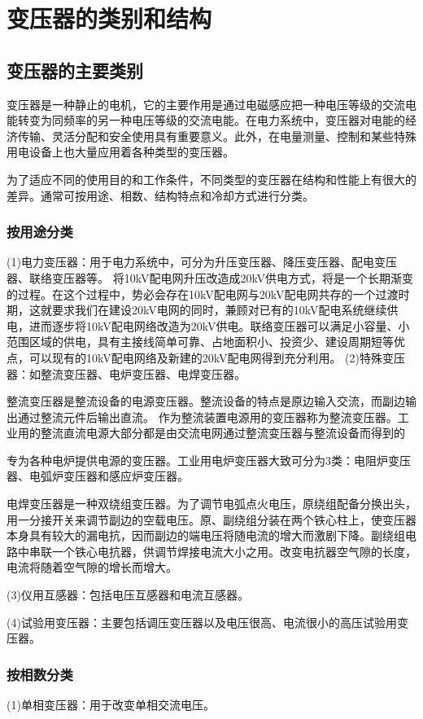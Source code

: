 \documentclass{book}
\begin{document}
\chapter{变压器的类别和结构}
\section{变压器的主要类别}
变压器是一种静止的电机，它的主要作用是通过电磁感应把一种电压等级的交流电能转变为同频率的另一种电压等级的交流电能。在电力系统中，变压器对电能的经济传输、灵活分配和安全使用具有重要意义。此外，在电量测量、控制和某些特殊用电设备上也大量应用着各种类型的变压器。

为了适应不同的使用目的和工作条件，不同类型的变压器在结构和性能上有很大的差异。通常可按用途、相数、结构特点和冷却方式进行分类。
\subsection{按用途分类}
(1)电力变压器：用于电力系统中，可分为升压变压器、降压变压器、配电变压器、联络变压器等。
将10kV配电网升压改造成20kV供电方式，将是一个长期渐变的过程。在这个过程中，势必会存在10kV配电网与20kV配电网共存的一个过渡时期，这就要求我们在建设20kV电网的同时，兼顾对已有的10kV配电系统继续供电，进而逐步将10kV配电网络改造为20kV供电。联络变压器可以满足小容量、小范围区域的供电，具有主接线简单可靠、占地面积小、投资少、建设周期短等优点，可以现有的10kV配电网络及新建的20kV配电网得到充分利用。
(2)特殊变压器：如整流变压器、电炉变压器、电焊变压器。

整流变压器是整流设备的电源变压器。整流设备的特点是原边输入交流，而副边输出通过整流元件后输出直流。 作为整流装置电源用的变压器称为整流变压器。工业用的整流直流电源大部分都是由交流电网通过整流变压器与整流设备而得到的

专为各种电炉提供电源的变压器。工业用电炉变压器大致可分为3类：电阻炉变压器、电弧炉变压器和感应炉变压器。

电焊变压器是一种双绕组变压器。为了调节电弧点火电压，原绕组配备分换出头，用一分接开关来调节副边的空载电压。原、副绕组分装在两个铁心柱上，使变压器本身具有较大的漏电抗，因而副边的端电压将随电流的增大而激剧下降。副绕组电路中串联一个铁心电抗器，供调节焊接电流大小之用。改变电抗器空气隙的长度，电流将随着空气隙的增长而增大。

(3)仪用互感器：包括电压互感器和电流互感器。

(4)试验用变压器：主要包括调压变压器以及电压很高、电流很小的高压试验用变压器。
\subsection{按相数分类}
(1)单相变压器：用于改变单相交流电压。
\end{document}
